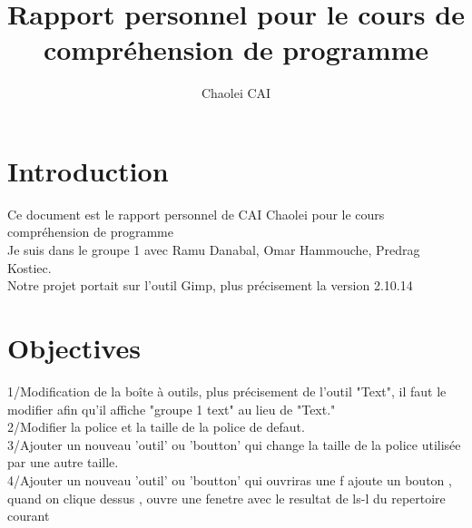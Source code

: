 \documentclass[12pt, letterpaper]{article}
\title{Rapport personnel pour le cours de compréhension de programme}
\author{Chaolei CAI}
\begin{document}
\begin{titlepage}
    \maketitle
\end{titlepage}

\tableofcontents
\section{Introduction}
Ce document est le rapport personnel de CAI Chaolei pour le cours compréhension de programme\\
Je suis dans le groupe 1 avec Ramu Danabal, Omar Hammouche, Predrag Kostiec. \\
Notre projet portait sur l'outil Gimp, plus précisement la version 2.10.14\\

\section{Objectives}
1/Modification de la boîte à outils, plus précisement de l'outil "Text", il faut le modifier afin qu'il affiche "groupe 1 text" au lieu de "Text."\\

2/Modifier la police et la taille de la police de defaut.\\

3/Ajouter un nouveau 'outil' ou 'boutton' qui change la taille de la police utilisée par une autre taille.\\

4/Ajouter un nouveau 'outil' ou 'boutton' qui ouvriras une f
 ajoute un bouton , quand on clique dessus , ouvre une fenetre avec le resultat de ls-l du repertoire courant
\end{document}
